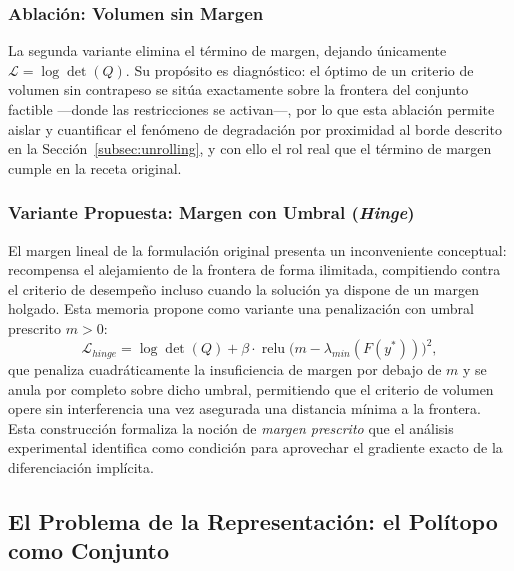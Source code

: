 \subsubsection{Ablación: Volumen sin Margen}
La segunda variante elimina el término de margen, dejando únicamente 
$\mathcal{L} = \log\det(Q)$. Su propósito es diagnóstico: el óptimo de un criterio de 
volumen sin contrapeso se sitúa exactamente sobre la frontera del conjunto factible 
---donde las restricciones se activan---, por lo que esta ablación permite aislar y 
cuantificar el fenómeno de degradación por proximidad al borde descrito en la 
Sección~\ref{subsec:unrolling}, y con ello el rol real que el término de margen cumple 
en la receta original.

\subsubsection{Variante Propuesta: Margen con Umbral (\textit{Hinge})}
El margen lineal de la formulación original presenta un inconveniente conceptual: 
recompensa el alejamiento de la frontera de forma ilimitada, compitiendo contra el 
criterio de desempeño incluso cuando la solución ya dispone de un margen holgado. Esta 
memoria propone como variante una penalización con umbral prescrito $m > 0$:
\begin{equation}
    \mathcal{L}_{hinge} = \log\det(Q) + \beta \cdot 
    \operatorname{relu}\big(m - \lambda_{min}(F(y^*))\big)^2,
    \label{eq:loss_hinge}
\end{equation}
que penaliza cuadráticamente la insuficiencia de margen por debajo de $m$ y se anula 
por completo sobre dicho umbral, permitiendo que el criterio de volumen opere sin 
interferencia una vez asegurada una distancia mínima a la frontera. Esta construcción 
formaliza la noción de \emph{margen prescrito} que el análisis experimental identifica 
como condición para aprovechar el gradiente exacto de la diferenciación implícita.










\subsection{El Problema de la Representación: el Polítopo como Conjunto}
\label{subsec:politopo_conjunto}

